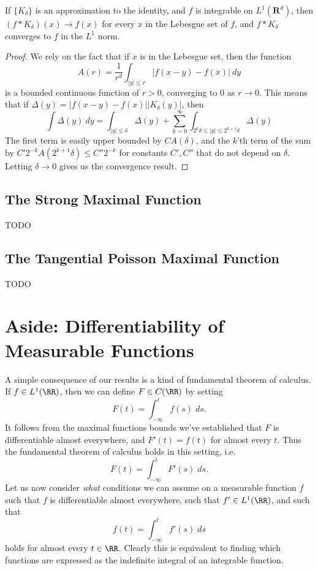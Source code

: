 \begin{theorem}
    If $\{ K_\delta \}$ is an approximation to the identity, and $f$ is integrable on $L^1(\mathbf{R}^d)$, then $(f * K_\delta)(x) \to f(x)$ for every $x$ in the Lebesgue set of $f$, and $f * K_\delta$ converges to $f$ in the $L^1$ norm.
\end{theorem}
\begin{proof}
    We rely on the fact that if $x$ is in the Lebesgue set, then the function
    \[ A(r) = \frac{1}{r^d} \int_{|y| \leq r} |f(x-y) - f(x)|\ dy \]
    is a bounded continuous function of $r > 0$, converging to $0$ as $r \to 0$. This means that if $\Delta(y) = |f(x-y) - f(x)| |K_\delta(y)|$, then
    \[ \int \Delta(y)\ dy = \int_{|y| \leq \delta} \Delta(y) + \sum_{k = 0}^\infty \int_{2^k \delta \leq |y| \leq 2^{k+1} \delta} \Delta(y) \]
    The first term is easily upper bounded by $CA(\delta)$, and the $k$'th term of the sum by $C'2^{-k}A(2^{k+1}\delta) \leq C''2^{-k}$ for constants $C',C''$ that do not depend on $\delta$. Letting $\delta \to 0$ gives us the convergence result.
\end{proof}

\section{The Strong Maximal Function}

TODO

\section{The Tangential Poisson Maximal Function}

TODO

\chapter{Aside: Differentiability of Measurable Functions}

A simple consequence of our results is a kind of fundamental theorem of calculus. If $f \in L^1(\RR)$, then we can define $F \in C(\RR)$ by setting
%
\[ F(t) = \int_{-\infty}^t f(s)\; ds. \]
%
It follows from the maximal functions bounds we've established that $F$ is differentiable almost everywhere, and $F'(t) = f(t)$ for almost every $t$. Thus the fundamental theorem of calculus holds in this setting, i.e.
%
\[ F(t) = \int_{-\infty}^t F'(s)\; ds. \]
%
Let us now consider \emph{what} conditions we can assume on a measurable function $f$ such that $f$ is differentiable almost everywhere, such that $f' \in L^1(\RR)$, and such that
%
\[ f(t) = \int_{-\infty}^t f'(s)\; ds \]
%
holds for almost every $t \in \RR$. Clearly this is equivalent to finding which functions are expressed as the indefinite integral of an integrable function.

